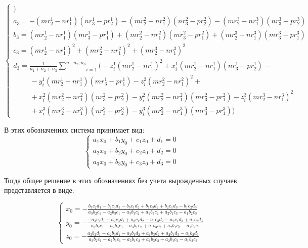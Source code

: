 $$\begin{cases}
	 \bigg) \\
	a_3 = - (m r_2^1 - n r_1^1) (n r_3^1 - p r_2^1) - (m r_2^2 - n r_1^2) (n r_3^2 - p r_2^2) - (m r_2^3 - n r_1^3) (n r_3^3 - p r_2^3) \\
	b_3 = (m r_2^1 - n r_1^1) (m r_3^1 - p r_1^1) + (m r_2^2 - n r_1^2) (m r_3^2 - p r_1^2) + (m r_2^3 - n r_1^3) (m r_3^3 - p r_1^3) \\
	c_3 = (m r_2^1 - n r_1^1)^2 + (m r_2^2 - n r_1^2)^2 + (m r_2^3 - n r_1^3)^2 \\
	d_3 = \frac{1}{n_1+n_2+n_3} \underset{i=1}{\overset{n_1, n_2, n_3}{\sum}} \bigg( 
		- z_i^1 (m r_2^1 - n r_1^1)^2
		+ x_i^1 (m r_2^1 - n r_1^1) (n r_3^1 - p r_2^1) - \\
		\hspace{1cm} - y_i^1  (m r_2^1 - n r_1^1) (m r_3^1 - p r_1^1)
		- z_i^2 (m r_2^2 - n r_1^2)^2 + \\
		\hspace{1cm} + x_i^2  (m r_2^2 - n r_1^2) (n r_3^2 - p r_2^2)
		- y_i^2 (m r_2^2 - n r_1^2) (m r_3^2 - p r_1^2)
		- z_i^3 (m r_2^3 - n r_1^3)^2\\
		\hspace{1cm} + x_i^3 (m r_2^3 - n r_1^3) (n r_3^3 - p r_2^3)
		- y_i^3 (m r_2^3 - n r_1^3) (m r_3^3 - p r_1^3)
	 \bigg)
\end{cases}$$

В этих обозначениях система принимает вид:
$$\begin{cases}
	a_1 x_0 + b_1 y_0 + c_1 z_0 + d_1 = 0 \\
	a_2 x_0 + b_2 y_0 + c_2 z_0 + d_2 = 0 \\
	a_3 x_0 + b_3 y_0 + c_3 z_0 + d_3 = 0
\end{cases}$$

\newpage
Тогда общее решение в этих обозначениях без учета вырожденных случаев представляется в виде:

$$\begin{cases}
	x_0 = -\frac{b_3 c_2 d_1 - b_2 c_3 d_1 - b_3 c_1 d_2 + b_1 c_3 d_2 + b_2 c_1 d_3 - b_1 c_2 d_3}{a_3 b_2 c_1 - a_2 b_3 c_1 - a_3 b_1 c_2 + a_1 b_3 c_2 + a_2 b_1 c_3 - a_1 b_2 c_3} \\
	y_0 = -\frac{-a_3 c_2 d_1 + a_2 c_3 d_1 + a_3 c_1 d_2 - a_1 c_3 d_2 - a_2 c_1 d_3 + a_1 c_2 d_3}{a_3 b_2 c_1 - a_2 b_3 c_1 - a_3 b_1 c_2 + a_1 b_3 c_2 + a_2 b_1 c_3 - a_1 b_2 c_3} \\
	z_0 = -\frac{a_3 b_2 d_1 - a_2 b_3 d_1 - a_3 b_1 d_2 + a_1 b_3 d_2 + a_2 b_1 d_3 - a_1 b_2 d_3}{a_3 b_2 c_1 - a_2 b_3 c_1 - a_3 b_1 c_2 + a_1 b_3 c_2 + a_2 b_1 c_3 - a_1 b_2 c_3}
\end{cases}$$


